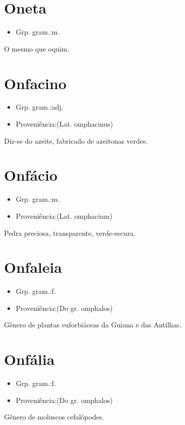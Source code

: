 \section{Oneta}
\begin{itemize}
\item {Grp. gram.:m.}
\end{itemize}
O mesmo que \textunderscore oquim\textunderscore .
\section{Onfacino}
\begin{itemize}
\item {Grp. gram.:adj.}
\end{itemize}
\begin{itemize}
\item {Proveniência:(Lat. \textunderscore omphacinus\textunderscore )}
\end{itemize}
Diz-se do azeite, fabricado de azeitonas verdes.
\section{Onfácio}
\begin{itemize}
\item {Grp. gram.:m.}
\end{itemize}
\begin{itemize}
\item {Proveniência:(Lat. \textunderscore omphacium\textunderscore )}
\end{itemize}
Pedra preciosa, transparente, verde-escura.
\section{Onfaleia}
\begin{itemize}
\item {Grp. gram.:f.}
\end{itemize}
\begin{itemize}
\item {Proveniência:(Do gr. \textunderscore omphalos\textunderscore )}
\end{itemize}
Gênero de plantas euforbiáceas da Guiana e das Antilhas.
\section{Onfália}
\begin{itemize}
\item {Grp. gram.:f.}
\end{itemize}
\begin{itemize}
\item {Proveniência:(Do gr. \textunderscore omphalos\textunderscore )}
\end{itemize}
Gênero de moluscos cefalópodes.

